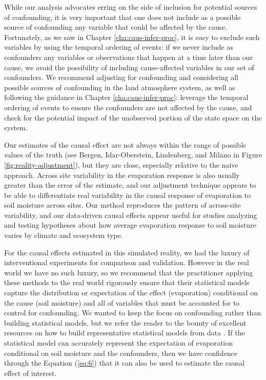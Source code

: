 While our analysis advocates erring on the side of inclusion for
potential sources of confounding, it is very important that one does
not include as a possible source of confounding any variable that
could be affected by the cause. Fortunately, as we saw in Chapter
\ref{cha:caus-infer-proc}, it is easy to exclude such variables by
using the temporal ordering of events: if we never include as
confounders any variables or observations that happen at a time later
than our cause, we avoid the possibility of including cause-affected
variables in our set of confounders. We recommend adjusting for
confounding and considering all possible sources of confounding in the
land atmosphere system, as well as following the guidance in Chapter
\ref{cha:caus-infer-proc}: leverage the temporal ordering of events to
ensure the confounders are not affected by the cause, and check for
the potential impact of the unobserved portion of the state space on
the system.

Our estimates of the causal effect are not always within the range of
possible values of the truth (see Bergen, Idar-Oberstein, Lindenberg,
and Milano in Figure \ref{fig:reality-adjustment}), but they are
close, especially relative to the naive approach. Across site
variability in the evaporation response is also usually greater than
the error of the estimate, and our adjustment technique appears to be
able to differentiate real variability in the causal response of
evaporation to soil moisture across sites. Our method reproduces the
pattern of across-site variability, and our data-driven causal effects
appear useful for studies analyzing and testing hypotheses about how
average evaporation response to soil moisture varies by climate and
ecosystem type.

For the causal effects estimated in this simulated reality, we had the
luxury of interventional experiments for comparison and
validation. However in the real world we have no such luxury, so we
recommend that the practitioner applying these methods to the real
world rigorously ensure that their statistical models capture the
distribution or expectation of the effect (evaporation) conditional on
the cause (soil moisture) and all of variables that must be accounted
for to control for confounding. We wanted to keep the focus on
confounding rather than building statistical models, but we refer the
reader to the bounty of excellent resources on how to build
representative statistical models from data
\cite{shalizi2013,blei2014,gelman1995bayesian}. If the
statistical model can accurately represent the expectation of
evaporation conditional on soil moisture and the confounders, then we
have confidence through the Equation (\ref{eq:6}) that it can also be
used to estimate the causal effect of interest.

